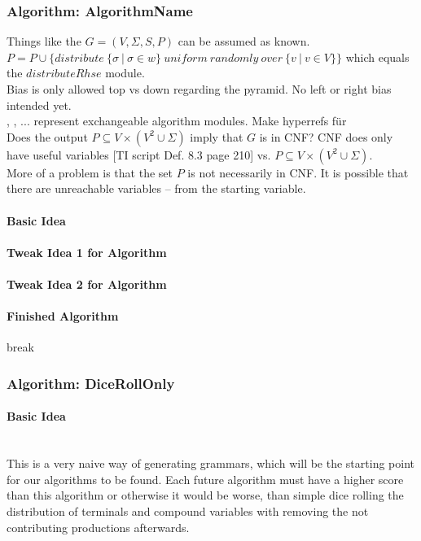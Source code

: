 \subsubsection{Algorithm: AlgorithmName}
\noindent Things like the $G=(V,\Sigma , S, P)$ can be assumed as known.\\
$P = P \cup \{distribute\ \{\sigma\ |\ \sigma \in w \}\ uniform\ randomly\ over\ \{v\ |\ v \in V \} \}$ which equals the $distributeRhse$ module.\\
\noindent Bias is only allowed top vs down regarding the pyramid. No left or right bias intended yet.\\
, , ... represent exchangeable algorithm modules. Make hyperrefs für \\

\noindent Does the output $P \subseteq V \times (V^{2} \cup \Sigma)$ imply that $G$ is in CNF? CNF does only have useful variables [TI script Def. 8.3 page 210] vs. $P \subseteq V \times (V^{2} \cup \Sigma)$.\\
\noindent More of a problem is that the set $P$ is not necessarily in CNF. It is possible that there are unreachable variables -- from the starting variable.

\paragraph{Basic Idea}

\paragraph{Tweak Idea 1 for Algorithm}

\paragraph{Tweak Idea 2 for Algorithm}

\paragraph{Finished Algorithm}
break
\pagebreak
\subsubsection{Algorithm: DiceRollOnly}
\paragraph{Basic Idea} \mbox{} \\
\noindent This is a very naive way of generating grammars, which will be the starting point for our algorithms to be found. Each future algorithm must have a higher score than this algorithm or otherwise it would be worse, than simple dice rolling the distribution of terminals and compound variables with removing the not contributing productions afterwards.
